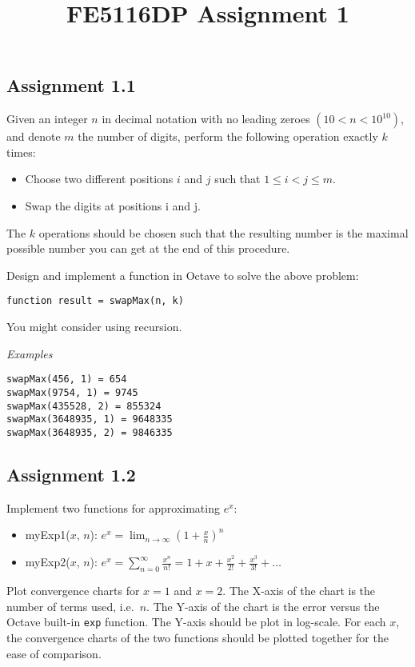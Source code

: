\documentclass[11pt,a4paper,hidelinks,fleqn]{article}            %
\title{\vspace{-5ex}FE5116DP Assignment 1\vspace{-7ex}}
\date{}
\begin{document}
\maketitle
\subsection*{Assignment 1.1}
Given an integer $n$ in decimal notation with no leading zeroes $(10 < n < 10^10)$,
and denote $m$ the number of digits,
perform the following operation exactly $k$ times: \vspace{-0.5cm}
\begin{itemize}
\item Choose two different positions $i$ and $j$ such that $1 \leq i < j \leq m$. 
\item Swap the digits at positions i and j. 
\end{itemize}
\vspace{-0.5cm}
The $k$ operations should be chosen such that the resulting number is the maximal possible number you can get at the end of this procedure. 

Design and implement a function in Octave to solve the above problem:
\begin{verbatim}
function result = swapMax(n, k)
\end{verbatim}
You might consider using recursion. 

\emph{Examples} \vspace{-0.9cm}
\begin{verbatim}
swapMax(456, 1) = 654
swapMax(9754, 1) = 9745
swapMax(435528, 2) = 855324
swapMax(3648935, 1) = 9648335
swapMax(3648935, 2) = 9846335
\end{verbatim}

\subsection*{Assignment 1.2}
Implement two functions for approximating $e^x$:
\begin{itemize}
\item myExp1($x$, $n$): $\displaystyle e^x = \lim_{n\rightarrow\infty}\left(1+\frac x n \right)^n$
\item myExp2($x$, $n$): $\displaystyle e^x = \sum_{n=0}^{\infty} \frac{x^n}{n!} = 1 + x + \frac{x^2}{2!} + \frac{x^3}{3!} + \ldots$
\end{itemize}
Plot convergence charts for $x=1$ and $x=2$.
The X-axis of the chart is the number of terms used, i.e.\ $n$.
The Y-axis of the chart is the error versus the Octave built-in \verb=exp= function.
The Y-axis should be plot in log-scale.
For each $x$, the convergence charts of the two functions should be plotted together for the ease of comparison.
\end{document}
